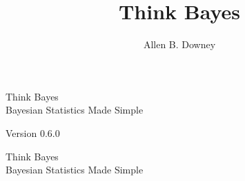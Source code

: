 \documentclass[12pt]{book}
\title{Think Bayes}
\author{Allen B. Downey}
\newcommand{\theversion}{0.6.0}
\newif\ifplastex
\begin{document}
\frontmatter

\ifplastex

\else
\fi

\newcommand{\PMF}{\mathrm{PMF}}
\newcommand{\PDF}{\mathrm{PDF}}
\newcommand{\CDF}{\mathrm{CDF}}
\newcommand{\ICDF}{\mathrm{ICDF}}

\ifplastex
    \usepackage{localdef}
    \maketitle

\else



\begin{latexonly}

\renewcommand{\blankpage}{\thispagestyle{empty} \quad \newpage}


\thispagestyle{empty}

\begin{flushright}
\vspace*{2.0in}

\begin{spacing}{3}
{\huge Think Bayes}\\
{\Large Bayesian Statistics Made Simple}
\end{spacing}

\vspace{0.25in}

Version \theversion

\vfill

\end{flushright}


\blankpage
\blankpage

\pagebreak
\thispagestyle{empty}

\begin{flushright}
\vspace*{2.0in}

\begin{spacing}{3}
{\huge Think Bayes}\\
{\Large Bayesian Statistics Made Simple}
\end{spacing}

\vspace{0.25in}


\end{flushright}
\end{latexonly}
\end{document}
